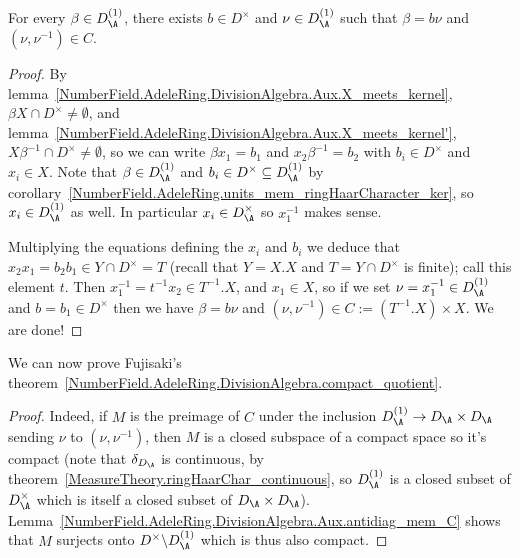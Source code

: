 \begin{lemma}
  \label{NumberField.AdeleRing.DivisionAlgebra.Aux.antidiag_mem_C}
  \leanok
  For every $\beta\in D_{\A}^{(1)}$, there exists $b\in D^\times$
  and $\nu\in D_{\A}^{(1)}$ such that $\beta=b\nu$ and $(\nu,\nu^{-1})\in C.$
\end{lemma}
\begin{proof}
  By lemma~\ref{NumberField.AdeleRing.DivisionAlgebra.Aux.X_meets_kernel},
  $\beta X\cap D^\times\not=\emptyset$,
  and lemma~\ref{NumberField.AdeleRing.DivisionAlgebra.Aux.X_meets_kernel'},
  $X\beta^{-1}\cap D^\times\not=\emptyset$,
  so we can write $\beta x_1=b_1$ and $x_2\beta^{-1}=b_2$ with $b_i\in D^\times$ and $x_i\in X$.
  Note that $\beta\in D_{\A}^{(1)}$ and $b_i\in D^{\times}\subseteq D_{\A}^{(1)}$ by
  corollary~\ref{NumberField.AdeleRing.units_mem_ringHaarCharacter_ker}, so $x_i\in D_{\A}^{(1)}$
  as well. In particular $x_i\in D_{\A}^\times$ so $x_1^{-1}$ makes sense.

  Multiplying the equations defining the $x_i$ and $b_i$ we deduce that
  $x_2x_1=b_2b_1\in Y\cap D^\times=T$ (recall that $Y=X.X$ and $T=Y\cap D^\times$
  is finite); call this element $t$. Then $x_1^{-1}=t^{-1}x_2\in T^{-1}.X$,
  and $x_1\in X$, so if we set $\nu=x_1^{-1}\in D_{\A}^{(1)}$
  and $b=b_1\in D^\times$ then we have $\beta=b\nu$ and $(\nu,\nu^{-1})\in C := (T^{-1}.X)\times X$.
  We are done!
\end{proof}

We can now prove Fujisaki's theorem~\ref{NumberField.AdeleRing.DivisionAlgebra.compact_quotient}.

\begin{proof}
  Indeed, if $M$ is the preimage of $C$ under the inclusion $D_{\A}^{(1)} \to D_{\A}\times D_{\A}$
  sending $\nu$ to $(\nu,\nu^{-1})$, then $M$ is a closed subspace
    of a compact
  space so it's compact (note that $\delta_{D_{\A}}$ is continuous,
  by theorem~\ref{MeasureTheory.ringHaarChar_continuous}, so $D_{\A}^{(1)}$ is a closed subset of
  $D_{\A}^\times$ which is itself a closed subset of $D_{\A}\times D_{\A}$).
  Lemma~\ref{NumberField.AdeleRing.DivisionAlgebra.Aux.antidiag_mem_C} shows that $M$ surjects onto
  $D^\times\backslash D_{\A}^{(1)}$ which is thus also compact.
\end{proof}


